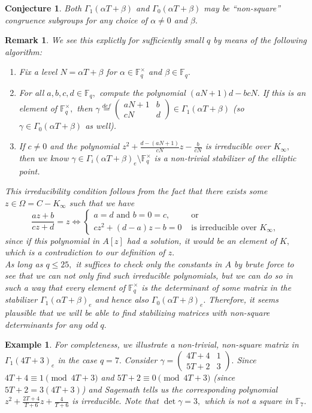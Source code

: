 \documentclass[11pt]{amsart}
\newtheorem{conjecture}[theorem]{Conjecture}
\newtheorem{example}[theorem]{Example}
\newtheorem{remark}[theorem]{Remark}
\theoremstyle{definition}
\numberwithin{equation}{section}
\newcommand{\cN}{\mathcal{N}}		%
\newcommand{\bbF}{\mathbb{F}}		%
\begin{document}
\begin{conjecture}	
		Both $\Gamma_1(\alpha T+\beta)$ and $\Gamma_0(\alpha T+\beta)$ may be ``non-square'' congruence subgroups for any choice of $\alpha\neq 0$ and $\beta.$ 
\end{conjecture}
\begin{remark}
	We see this explictly for sufficiently small $q$ by means of the following algorithm:
	\begin{enumerate}
		\item Fix a level $N=\alpha T+\beta$ for $\alpha\in \bbF_q^{\times}$ and $\beta\in \bbF_q.$
		\item For all $a,b,c,d\in \bbF_q,$ compute the polynomial $(aN+1)d-bcN.$ If this is an element of $\bbF_q^{\times},$ then $\displaystyle{\gamma\overset{def}{=}\left(\begin{array}{cc} aN+1&b\\cN&d\end{array}\right)\in \Gamma_1(\alpha T+\beta)}$ (so $\gamma\in \Gamma_0(\alpha T+\beta)$ as well).
		\item If $c\neq 0$ and the polynomial $\displaystyle{z^2+\frac{d-(aN+1)}{cN}z-\frac{b}{cN}}$ is irreducible over $K_{\infty},$ then we know $\gamma\in \Gamma_i(\alpha T+\beta)_e\setminus \bbF_q^{\times}$ is a non-trivial stabilizer of the elliptic point. 
	\end{enumerate}
	This irreducibility condition follows from the fact that there exists some $z\in \Omega = C-K_{\infty}$ such that we have 
	\[\frac{az+b}{cz+d}=z \iff \begin{cases}
	a=d \text{ and } b=0=c, &\text{ or }\\
	cz^2+(d-a)z-b=0 & \text{ is irreducible over }K_{\infty},
	\end{cases}\] since if this polynomial in $A[z]$ had a solution, it would be an element of $K,$ which is a contradiction to our definition of $z.$\\
	
	As long as $q\leq 25,$ it suffices to check only the constants in $A$ by brute force to see that we can not only find such irreducible polynomials, but we can do so in such a way that every element of $\bbF_q^{\times}$ is the determinant of some matrix in the stabilizer $\Gamma_1(\alpha T+\beta)_e$ and hence also $\Gamma_0(\alpha T+\beta)_e.$ Therefore, it seems plausible that we will be able to find stabilizing matrices with non-square determinants for any odd $q.$  
\end{remark}
\begin{example}
	For completeness, we illustrate a non-trivial, non-square matrix in $\Gamma_1(4T+3)_e$ in the case $q=7.$ Consider $\displaystyle{\gamma=\left(\begin{array}{cc}4T+4&1\\5T+2&3\end{array}\right)}.$ Since $4T+4\equiv 1\pmod{4T+3}$ and $5T+2\equiv 0\pmod{4T+3}$ (since $5T+2=3(4T+3)$) and Sagemath tells us the corresponding polynomial $\displaystyle{z^2+\frac{2T+4}{T+6}z+\frac{4}{T+6}}$ is irreducible. Note that $\det\gamma = 3,$ which is not a square in $\bbF_7.$
\end{example}
\end{document}
